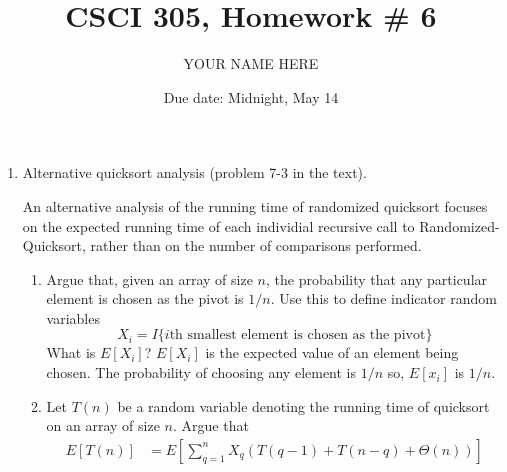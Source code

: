 \documentclass{article}
\title{CSCI 305, Homework \# 6}
\author{YOUR NAME HERE}
\date{Due date:  Midnight, May 14}
\begin{document}
  
  \maketitle
  
  \begin{enumerate}
  \item Alternative quicksort analysis (problem 7-3 in the text).
  
    An alternative analysis of the running time of randomized quicksort
    focuses on the expected running time of each individial recursive
    call to {\sc Randomized-Quicksort}, rather than on the number of
    comparisons performed.
  
    \begin{enumerate}
      \item Argue that, given an array of size $n$, the probability that
        any particular element is chosen as the pivot is $1/n$.  Use
        this to define indicator random variables
        \[
        X_i = I\{\mbox{$i$th smallest element is chosen as the pivot}\}
        \]
        What is $E[X_i]$?
        $E[X_i]$ is the expected value of an element being chosen.
        The probability of choosing any element is $1/n$ so, $E[x_i]$ is $1/n$.

      \item
        Let $T(n)$ be a random variable denoting the running time of
        quicksort on an array of size $n$.  Argue that
        \begin{align}
        E[T(n)] &= E\left[
          \sum_{q=1}^n X_q(T(q-1) + T(n-q) + \Theta(n))
          \right]
        \label{eqn1}
        \end{align}
  

\end{enumerate}
\end{enumerate}
\end{document}
